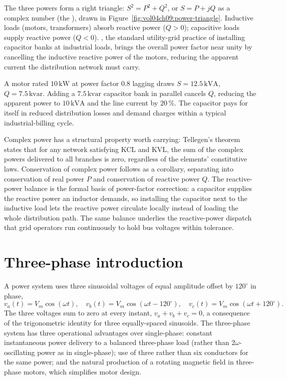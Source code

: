 

The three powers form a right triangle: $S^{2} = P^{2}+Q^{2}$, or
$S = P + jQ$ as a complex number (the ), drawn
in Figure~\ref{fig:vol04ch09:power-triangle}.
Inductive loads (motors, transformers) absorb reactive power
($Q>0$); capacitive loads supply reactive power ($Q<0$).
, the standard utility-grid practice
of installing capacitor banks at industrial loads, brings the overall
power factor near unity by cancelling the inductive reactive power of
the motors, reducing the apparent current the distribution network
must carry.

A motor rated $10\,\si{\kilo\watt}$ at power factor $0.8$ lagging
draws $S = 12.5\,\si{\kilo\volt\ampere}$, $Q = 7.5\,\text{kvar}$.
Adding a $7.5\,\text{kvar}$ capacitor bank in parallel cancels $Q$,
reducing the apparent power
to $10\,\si{\kilo\volt\ampere}$ and the line current by $20\,\%$. The
capacitor pays for itself in reduced distribution losses and demand
charges within a typical industrial-billing cycle.

\begin{mastery}
Complex power has a structural property worth carrying: Tellegen's
theorem states that for any network satisfying KCL and KVL, the sum of
the complex powers delivered to all branches is zero, regardless of the
elements' constitutive laws. Conservation of complex power follows as a
corollary, separating into conservation of real power $P$ and
conservation of reactive power $Q$. The reactive-power balance is the
formal basis of power-factor correction: a capacitor supplies the
reactive power an inductor demands, so installing the capacitor next to
the inductive load lets the reactive power circulate locally instead of
loading the whole distribution path. The same balance underlies the
reactive-power dispatch that grid operators run continuously to hold bus
voltages within tolerance.
\end{mastery}

\section{Three-phase introduction}

A  power system uses three sinusoidal voltages
of equal amplitude offset by $120^{\circ}$ in phase,
\[
v_{a}(t) = V_{m}\cos(\omega t), \quad v_{b}(t) = V_{m}\cos(\omega t -
120^{\circ}), \quad v_{c}(t) = V_{m}\cos(\omega t + 120^{\circ}).
\]
The three voltages sum to zero at every instant, $v_{a}+v_{b}+v_{c}=0$,
a consequence of the trigonometric identity for three equally-spaced
sinusoids. The three-phase system has three operational advantages
over single-phase: constant instantaneous power delivery to a balanced
three-phase load (rather than $2\omega$-oscillating power as in
single-phase); use of three rather than six conductors for the same
power; and the natural production of a rotating magnetic field in
three-phase motors, which simplifies motor design.

